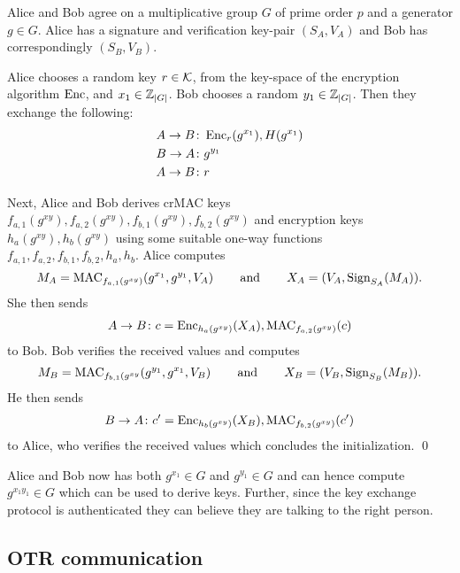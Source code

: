 \begin{protocol}\label{proto:otrinit}
  Alice and Bob agree on a multiplicative group \(G\) of prime order \(p\) and 
  a generator \(g\in G\).
  Alice has a signature and verification key-pair \((S_A, V_A)\) and Bob has 
  correspondingly \((S_B, V_B)\).

  Alice chooses a random key \(r\in \operatorname{\mathcal K}\), from the key-space of the encryption 
  algorithm \(\operatorname{\mathrm{Enc}}\), and \(x_1\in \operatorname{\mathbb Z}_{|G|}\).
  Bob chooses a random \(y_1\in \operatorname{\mathbb Z}_{|G|}\).
  Then they exchange the following:
  \begin{align*}
    A\to B &\colon \operatorname{\mathrm{Enc}}_r( g^{x_1} ), H( g^{x_1} ) \\
    B\to A &\colon g^{y_1} \\
    A\to B &\colon r
  \end{align*}

  Next, Alice and Bob derives \ac{crMAC} keys \(f_{a,1}( g^{xy} ), f_{a,2}( 
  g^{xy} ), f_{b,1}( g^{xy} ), f_{b,2}( g^{xy} )\) and encryption keys \(h_a( 
  g^{xy} ), h_b( g^{xy} )\) using some suitable one-way functions \(f_{a,1}, 
  f_{a,2}, f_{b,1}, f_{b,2}, h_a, h_b\).
  Alice computes \[M_A = \operatorname{\mathrm{MAC}}_{f_{a,1}(g^{xy})}( g^{x_1}, g^{y_1}, V_A 
  )\operatorname{\qquad and\qquad} X_A = ( V_A, \operatorname{\mathrm{Sign}}_{S_A}( M_A ) ).\]
  She then sends
  \begin{align*}
    A\to B\colon c = \operatorname{\mathrm{Enc}}_{h_a(g^{xy})}( X_A ), \operatorname{\mathrm{MAC}}_{f_{a,2}(g^{xy})}( c )
  \end{align*}
  to Bob.
  Bob verifies the received values and computes \[M_B = \operatorname{\mathrm{MAC}}_{f_{b,1}(g^{xy}}( 
  g^{y_1}, g^{x_1}, V_B )\operatorname{\qquad and\qquad} X_B = ( V_B, \operatorname{\mathrm{Sign}}_{S_B}( M_B ) ).\]
  He then sends
  \begin{align*}
    B\to A\colon c^\prime = \operatorname{\mathrm{Enc}}_{h_b(g^{xy})}( X_B ), \operatorname{\mathrm{MAC}}_{f_{b,2}(g^{xy})}( 
    c^\prime )
  \end{align*}
  to Alice, who verifies the received values which concludes the 
  initialization.
  \qed
\end{protocol}

Alice and Bob now has both \(g^{x_1}\in G\) and \(g^{y_1}\in G\) and can hence 
compute \(g^{x_1 y_1}\in G\) which can be used to derive keys.
Further, since the key exchange protocol is authenticated they can believe they 
are talking to the right person.

\subsection{\acs{OTR} communication}

